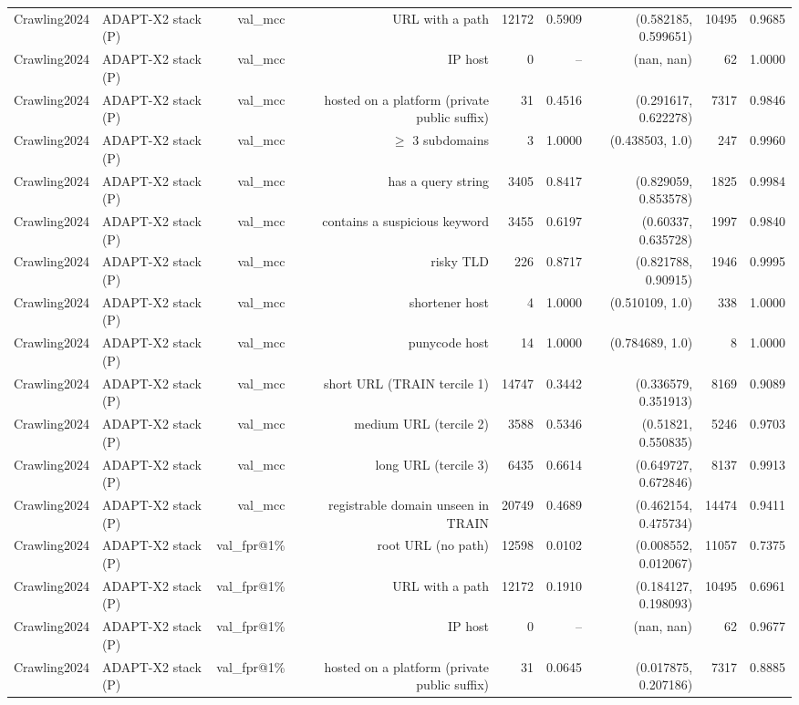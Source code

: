 \begin{table}[t]
\begin{tabular}{llrrrrrrr}
Crawling2024 & ADAPT-X2 stack (P) & val\_mcc & URL with a path & 12172 & 0.5909 & (0.582185, 0.599651) & 10495 & 0.9685 \\
Crawling2024 & ADAPT-X2 stack (P) & val\_mcc & IP host & 0 & -- & (nan, nan) & 62 & 1.0000 \\
Crawling2024 & ADAPT-X2 stack (P) & val\_mcc & hosted on a platform (private public suffix) & 31 & 0.4516 & (0.291617, 0.622278) & 7317 & 0.9846 \\
Crawling2024 & ADAPT-X2 stack (P) & val\_mcc & $\geq$ 3 subdomains & 3 & 1.0000 & (0.438503, 1.0) & 247 & 0.9960 \\
Crawling2024 & ADAPT-X2 stack (P) & val\_mcc & has a query string & 3405 & 0.8417 & (0.829059, 0.853578) & 1825 & 0.9984 \\
Crawling2024 & ADAPT-X2 stack (P) & val\_mcc & contains a suspicious keyword & 3455 & 0.6197 & (0.60337, 0.635728) & 1997 & 0.9840 \\
Crawling2024 & ADAPT-X2 stack (P) & val\_mcc & risky TLD & 226 & 0.8717 & (0.821788, 0.90915) & 1946 & 0.9995 \\
Crawling2024 & ADAPT-X2 stack (P) & val\_mcc & shortener host & 4 & 1.0000 & (0.510109, 1.0) & 338 & 1.0000 \\
Crawling2024 & ADAPT-X2 stack (P) & val\_mcc & punycode host & 14 & 1.0000 & (0.784689, 1.0) & 8 & 1.0000 \\
Crawling2024 & ADAPT-X2 stack (P) & val\_mcc & short URL (TRAIN tercile 1) & 14747 & 0.3442 & (0.336579, 0.351913) & 8169 & 0.9089 \\
Crawling2024 & ADAPT-X2 stack (P) & val\_mcc & medium URL (tercile 2) & 3588 & 0.5346 & (0.51821, 0.550835) & 5246 & 0.9703 \\
Crawling2024 & ADAPT-X2 stack (P) & val\_mcc & long URL (tercile 3) & 6435 & 0.6614 & (0.649727, 0.672846) & 8137 & 0.9913 \\
Crawling2024 & ADAPT-X2 stack (P) & val\_mcc & registrable domain unseen in TRAIN & 20749 & 0.4689 & (0.462154, 0.475734) & 14474 & 0.9411 \\
Crawling2024 & ADAPT-X2 stack (P) & val\_fpr@1\% & root URL (no path) & 12598 & 0.0102 & (0.008552, 0.012067) & 11057 & 0.7375 \\
Crawling2024 & ADAPT-X2 stack (P) & val\_fpr@1\% & URL with a path & 12172 & 0.1910 & (0.184127, 0.198093) & 10495 & 0.6961 \\
Crawling2024 & ADAPT-X2 stack (P) & val\_fpr@1\% & IP host & 0 & -- & (nan, nan) & 62 & 0.9677 \\
Crawling2024 & ADAPT-X2 stack (P) & val\_fpr@1\% & hosted on a platform (private public suffix) & 31 & 0.0645 & (0.017875, 0.207186) & 7317 & 0.8885 \\

\end{tabular}
\end{table}
